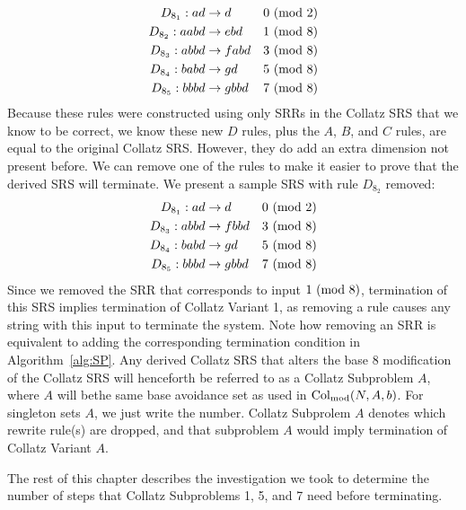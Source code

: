 \begin{align*}
    D_{8_1}: ad &\rightarrow d &\text{$0\ (\mathrm{mod}\ 2)$}\\
    D_{8_2}: aabd &\rightarrow ebd &\text{$1\ (\mathrm{mod}\ 8)$}\\
    D_{8_3}: abbd &\rightarrow fabd &\text{$3\ (\mathrm{mod}\ 8)$}\\
    D_{8_4}: babd &\rightarrow gd &\text{$5\ (\mathrm{mod}\ 8)$}\\
    D_{8_5}: bbbd &\rightarrow gbbd &\text{$7\ (\mathrm{mod}\ 8)$}
\end{align*}
Because these rules were constructed using only SRRs in the Collatz SRS that we know to be correct, we know these new $D$ rules, plus the $A$, $B$, and $C$ rules, are equal to the original Collatz SRS. However, they do add an extra dimension not present before. We can remove one of the rules to make it easier to prove that the derived SRS will terminate. We present a sample SRS with rule $D_{8_2}$ removed:
\begin{align*}
    D_{8_1}: ad &\rightarrow d &\text{$0\ (\mathrm{mod}\ 2)$}\\
    D_{8_3}: abbd &\rightarrow fbbd &\text{$3\ (\mathrm{mod}\ 8)$}\\
    D_{8_4}: babd &\rightarrow gd &\text{$5\ (\mathrm{mod}\ 8)$}\\
    D_{8_5}: bbbd &\rightarrow gbbd &\text{$7\ (\mathrm{mod}\ 8)$}
\end{align*}
Since we removed the SRR that corresponds to input $1 \ (\mathrm{mod}\ 8)$, termination of this SRS implies termination of Collatz Variant 1, as removing a rule causes any string with this input to terminate the system. Note how removing an SRR is equivalent to adding the corresponding termination condition in Algorithm~\ref{alg:SP}. Any derived Collatz SRS that alters the base 8 modification of the Collatz SRS will henceforth be referred to as a Collatz Subproblem $A$, where $A$ will bethe same base avoidance set as used in $\mathrm{Col}_{\text{mod}}(N,A,b)$. For singleton sets $A$, we just write the number. Collatz Subprolem $A$ denotes which rewrite rule(s) are dropped, and that subproblem $A$ would imply termination of Collatz Variant $A$.\par
The rest of this chapter describes the investigation we took to determine the number of steps that Collatz Subproblems 1, 5, and 7 need before terminating.
